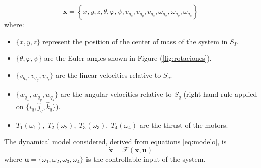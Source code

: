 \documentclass[conference]{IEEEtran}
\newcommand{\refp}[1]{(\ref{#1})}
\begin{document}
\begin{equation}
\mathbf{x}=\left\lbrace  x,y,z, \theta,\varphi,\psi, v_{q_z},v_{q_y},v_{q_z},\omega_{q_x},\omega_{q_y},\omega_{q_z} \right\rbrace
\label{eq:sv}
\end{equation}
where:
\begin{itemize}
\item $\lbrace x,y,z \rbrace$ represent the position of the center of mass of the system in $S_I$.
\item $\lbrace\theta,\varphi,\psi\rbrace$ are the Euler angles shown in Figure \refp{fig:rotaciones}.
\item $\lbrace v_{q_x},v_{q_y},v_{q_z}\rbrace$ are the linear velocities relative to $S_q$.
\item $\lbrace w_{q_x},w_{q_y},w_{q_z}\rbrace$ are the angular velocities relative to $S_q$ (right hand rule applied on $\lbrace \hat{i}_q,\hat{j}_q,\hat{k}_q\rbrace$).
\item $T_1(\omega_1),\;T_2(\omega_2),\;T_3(\omega_3),\;T_4(\omega_4)$ are the thrust of the motors.
\end{itemize}
The dynamical model considered, derived from equations \ref{eq:modelo}, is
\begin{equation}
	\dot{\mathbf{x}}=\mathcal{F}(\mathbf{x},\mathbf{u})
	\label{ec:fxu}
\end{equation}
where $\mathbf{u}=\{\omega_1,\omega_2,\omega_3,\omega_4\}$ is the controllable input of the system. 
\end{document}
